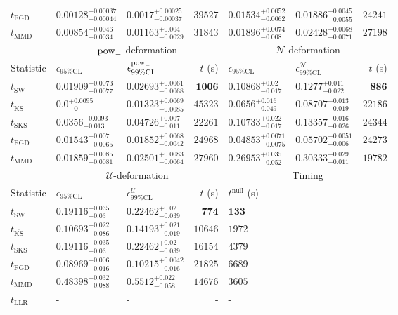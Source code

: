 \begin{tabular}{l|llr|llr}
	$t_{\mathrm{FGD}}$ & ${\mathbf{0.00128_{-0.00044}^{+0.00037}}}$ & ${\mathbf{0.0017_{-0.00037}^{+0.00025}}}$ & $39527$ & $0.01534_{-0.0062}^{+0.0052}$ & $0.01886_{-0.0055}^{+0.0045}$ & $24241$ \\
	$t_{\mathrm{MMD}}$ & $0.00854_{-0.0034}^{+0.0046}$ & $0.01163_{-0.0029}^{+0.004}$ & $31843$ & $0.01896_{-0.008}^{+0.0074}$ & $0.02428_{-0.0071}^{+0.0068}$ & $27198$ \\
	\toprule
	\multicolumn{1}{c}{} & \multicolumn{3}{c}{$\rm{pow}_{-}$-deformation} & \multicolumn{3}{c}{$\mathcal{N}$-deformation} \\
	Statistic & $\epsilon_{95\%\mathrm{CL}}$ & $\epsilon^  {\rm{pow}_{-}}_{99\%\mathrm{CL}}$ & $t$ (s) & $\epsilon_{95\%\mathrm{CL}}$ & $\epsilon^    {\mathcal{N}}_{99\%\mathrm{CL}}$ & $t$ (s) \\
	\midrule
	$t_{\mathrm{SW}}$ & $0.01909_{-0.0077}^{+0.0073}$ & $0.02693_{-0.0068}^{+0.0061}$ & ${\mathbf{1006}}$ & $0.10868_{-0.017}^{+0.02}$ & $0.1277_{-0.022}^{+0.011}$ & ${\mathbf{886}}$ \\
	$t_{\overline{\mathrm{KS}}}$ & ${\mathbf{0.0_{-0}^{+0.0095}}}$ & ${\mathbf{0.01323_{-0.0085}^{+0.0069}}}$ & $45323$ & $0.0656_{-0.049}^{+0.016}$ & $0.08707_{-0.019}^{+0.013}$ & $22186$ \\
	$t_{\mathrm{SKS}}$ & $0.0356_{-0.013}^{+0.0093}$ & $0.04726_{-0.011}^{+0.007}$ & $22261$ & $0.10733_{-0.017}^{+0.022}$ & $0.13357_{-0.026}^{+0.016}$ & $24344$ \\
	$t_{\mathrm{FGD}}$ & $0.01543_{-0.0065}^{+0.007}$ & $0.01852_{-0.0042}^{+0.0068}$ & $24968$ & ${\mathbf{0.04853_{-0.0075}^{+0.0071}}}$ & ${\mathbf{0.05702_{-0.006}^{+0.0051}}}$ & $24273$ \\
	$t_{\mathrm{MMD}}$ & $0.01859_{-0.0081}^{+0.0085}$ & $0.02501_{-0.0064}^{+0.0083}$ & $27960$ & $0.26953_{-0.052}^{+0.035}$ & $0.30333_{-0.011}^{+0.029}$ & $19782$ \\
	\toprule
	\multicolumn{1}{c}{} & \multicolumn{3}{c}{$\mathcal{U}$-deformation} & \multicolumn{3}{c}{Timing} \\
	Statistic & $\epsilon_{95\%\mathrm{CL}}$ & $\epsilon^    {\mathcal{U}}_{99\%\mathrm{CL}}$ & $t$ (s) & $t^{\mathrm{null}}$ (s) \\
	\midrule
	$t_{\mathrm{SW}}$ & $0.19116_{-0.03}^{+0.035}$ & $0.22462_{-0.039}^{+0.02}$ & ${\mathbf{774}}$ & ${\mathbf{133}}$ \\
	$t_{\overline{\mathrm{KS}}}$ & $0.10693_{-0.086}^{+0.022}$ & $0.14193_{-0.019}^{+0.021}$ & $10646$ & $1972$ \\
	$t_{\mathrm{SKS}}$ & $0.19116_{-0.03}^{+0.035}$ & $0.22462_{-0.039}^{+0.02}$ & $16154$ & $4379$ \\
	$t_{\mathrm{FGD}}$ & ${\mathbf{0.08969_{-0.016}^{+0.006}}}$ & ${\mathbf{0.10215_{-0.016}^{+0.0042}}}$ & $21825$ & $6689$ \\
	$t_{\mathrm{MMD}}$ & $0.48398_{-0.088}^{+0.032}$ & $0.5512_{-0.058}^{+0.022}$ & $14676$ & $3605$ \\
	$t_{\mathrm{LLR}}$ & - & - & - & - \\
	\bottomrule
\end{tabular}